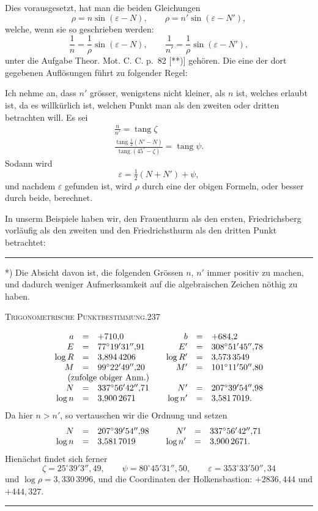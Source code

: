Dies vorausgesetzt, hat man die beiden Gleichungen
\[
\rho=n\sin(\varepsilon-N),\qquad\rho=n'\sin(\varepsilon-N'),
\]
welche, wenn sie so geschrieben werden:
\[
\frac1n=\frac1\rho\sin(\varepsilon-N),\qquad\frac1{n'}=\frac1\rho\sin(\varepsilon-N'),
\]
unter die Aufgabe Theor. Mot. C. C. p.~82 [**)] gehören. Die eine der dort gegebenen Auflösungen führt zu folgender Regel:

Ich nehme an, dass $n'$ grösser, wenigstens nicht kleiner, als $n$ ist, welches erlaubt ist, da es willkürlich ist, welchen Punkt man als den zweiten oder dritten betrachten will. Es sei
\[
\begin{gathered}
\frac n{n'}=\operatorname{tang}\zeta\\[5pt]
\frac{\operatorname{tang}\frac12(N'-N)}{\operatorname{tang}(45^\circ-\zeta)}=\operatorname{tang}\psi.
\end{gathered}
\]
Sodann wird
\[
\varepsilon=\tfrac12(N+N')+\psi,
\]
und nachdem $\varepsilon$ gefunden ist, wird $\rho$ durch eine der obigen Formeln, oder besser durch beide, berechnet.

In unserm Beispiele haben wir, den Frauenthurm als den ersten, Friedrichsberg vorläufig als den zweiten und den Friedrichsthurm als den dritten Punkt betrachtet:
\vfill
\noindent\rule{4cm}{.4pt}\par
{\footnotesize
*) Die Absicht davon ist, die folgenden Grössen $n$, $n'$ immer positiv zu machen, und dadurch weniger Aufmerksamkeit auf die algebraischen Zeichen nöthig zu haben.\par
[**) Band VII, Seite 100.]\par}

\clearpage
\noindent\mbox{}\hfill\textsc{Trigonometrische Punktbestimmung.}\hfill237\par\medskip
\[
\begin{array}{rcl@{\qquad}rcl}
a&=&+710{,}0&b&=&+684{,}2\\
E&=&77^\circ19'31''{,}91&E'&=&308^\circ51'45''{,}78\\
\log R&=&3{,}894\,4206&\log R'&=&3{,}573\,3549\\
M&=&99^\circ22'49''{,}20&M'&=&101^\circ11'50''{,}80\\
\multicolumn{3}{c}{\text{(zufolge obiger Anm.)}}&&&\\
N&=&337^\circ56'42''{,}71&N'&=&207^\circ39'54''{,}98\\
\log n&=&3{,}900\,2671&\log n'&=&3{,}581\,7019.
\end{array}
\]
Da hier $n>n'$, so vertauschen wir die Ordnung und setzen
\[
\begin{array}{rcl@{\qquad}rcl}
N&=&207^\circ39'54''{,}98&N'&=&337^\circ56'42''{,}71\\
\log n&=&3{,}581\,7019&\log n'&=&3{,}900\,2671.
\end{array}
\]
Hienächst findet sich ferner
\[
\zeta=25^\circ39'3''{,}49,\qquad
\psi=80^\circ45'31''{,}50,\qquad
\varepsilon=353^\circ33'50''{,}34
\]
und $\log\rho=3{,}330\,3996$, und die Coordinaten der Holkensbastion: $+2836{,}444$ und $+444{,}327$.
\vspace{1cm}
\begin{center}\rule{4cm}{.4pt}\end{center}

